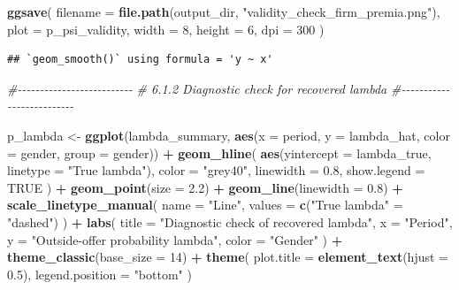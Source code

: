 \documentclass[
]{article}
\newenvironment{Shaded}{\begin{snugshade}}{\end{snugshade}}
\newcommand{\AttributeTok}[1]{\textcolor[rgb]{0.13,0.29,0.53}{#1}}
\newcommand{\CommentTok}[1]{\textcolor[rgb]{0.56,0.35,0.01}{\textit{#1}}}
\newcommand{\ConstantTok}[1]{\textcolor[rgb]{0.56,0.35,0.01}{#1}}
\newcommand{\DecValTok}[1]{\textcolor[rgb]{0.00,0.00,0.81}{#1}}
\newcommand{\FloatTok}[1]{\textcolor[rgb]{0.00,0.00,0.81}{#1}}
\newcommand{\FunctionTok}[1]{\textcolor[rgb]{0.13,0.29,0.53}{\textbf{#1}}}
\newcommand{\NormalTok}[1]{#1}
\newcommand{\OtherTok}[1]{\textcolor[rgb]{0.56,0.35,0.01}{#1}}
\newcommand{\SpecialCharTok}[1]{\textcolor[rgb]{0.81,0.36,0.00}{\textbf{#1}}}
\newcommand{\StringTok}[1]{\textcolor[rgb]{0.31,0.60,0.02}{#1}}
\begin{document}
\begin{Shaded}
\begin{Highlighting}[]
\FunctionTok{ggsave}\NormalTok{(}
    \AttributeTok{filename =} \FunctionTok{file.path}\NormalTok{(output\_dir, }\StringTok{"validity\_check\_firm\_premia.png"}\NormalTok{),}
    \AttributeTok{plot =}\NormalTok{ p\_psi\_validity,}
    \AttributeTok{width =} \DecValTok{8}\NormalTok{,}
    \AttributeTok{height =} \DecValTok{6}\NormalTok{,}
    \AttributeTok{dpi =} \DecValTok{300}
\NormalTok{)}
\end{Highlighting}
\end{Shaded}

\begin{verbatim}
## `geom_smooth()` using formula = 'y ~ x'
\end{verbatim}

\begin{Shaded}
\begin{Highlighting}[]
\CommentTok{\#{-}{-}{-}{-}{-}{-}{-}{-}{-}{-}{-}{-}{-}{-}{-}{-}{-}{-}{-}{-}{-}{-}{-}{-}{-}{-}}
\CommentTok{\# 6.1.2 Diagnostic check for recovered lambda}
\CommentTok{\#{-}{-}{-}{-}{-}{-}{-}{-}{-}{-}{-}{-}{-}{-}{-}{-}{-}{-}{-}{-}{-}{-}{-}{-}{-}{-}}

\NormalTok{p\_lambda }\OtherTok{\textless{}{-}} \FunctionTok{ggplot}\NormalTok{(lambda\_summary, }\FunctionTok{aes}\NormalTok{(}\AttributeTok{x =}\NormalTok{ period, }\AttributeTok{y =}\NormalTok{ lambda\_hat, }\AttributeTok{color =}\NormalTok{ gender, }\AttributeTok{group =}\NormalTok{ gender)) }\SpecialCharTok{+}
    \FunctionTok{geom\_hline}\NormalTok{(}
        \FunctionTok{aes}\NormalTok{(}\AttributeTok{yintercept =}\NormalTok{ lambda\_true, }\AttributeTok{linetype =} \StringTok{"True lambda"}\NormalTok{),}
        \AttributeTok{color =} \StringTok{"grey40"}\NormalTok{,}
        \AttributeTok{linewidth =} \FloatTok{0.8}\NormalTok{,}
        \AttributeTok{show.legend =} \ConstantTok{TRUE}
\NormalTok{    ) }\SpecialCharTok{+}
    \FunctionTok{geom\_point}\NormalTok{(}\AttributeTok{size =} \FloatTok{2.2}\NormalTok{) }\SpecialCharTok{+}
    \FunctionTok{geom\_line}\NormalTok{(}\AttributeTok{linewidth =} \FloatTok{0.8}\NormalTok{) }\SpecialCharTok{+}
    \FunctionTok{scale\_linetype\_manual}\NormalTok{(}
        \AttributeTok{name =} \StringTok{"Line"}\NormalTok{,}
        \AttributeTok{values =} \FunctionTok{c}\NormalTok{(}\StringTok{"True lambda"} \OtherTok{=} \StringTok{"dashed"}\NormalTok{)}
\NormalTok{    ) }\SpecialCharTok{+}
    \FunctionTok{labs}\NormalTok{(}
        \AttributeTok{title =} \StringTok{"Diagnostic check of recovered lambda"}\NormalTok{,}
        \AttributeTok{x =} \StringTok{"Period"}\NormalTok{,}
        \AttributeTok{y =} \StringTok{"Outside{-}offer probability lambda"}\NormalTok{,}
        \AttributeTok{color =} \StringTok{"Gender"}
\NormalTok{    ) }\SpecialCharTok{+}
    \FunctionTok{theme\_classic}\NormalTok{(}\AttributeTok{base\_size =} \DecValTok{14}\NormalTok{) }\SpecialCharTok{+}
    \FunctionTok{theme}\NormalTok{(}
        \AttributeTok{plot.title =} \FunctionTok{element\_text}\NormalTok{(}\AttributeTok{hjust =} \FloatTok{0.5}\NormalTok{),}
        \AttributeTok{legend.position =} \StringTok{"bottom"}
\NormalTok{    )}


\end{Highlighting}
\end{Shaded}
\end{document}
